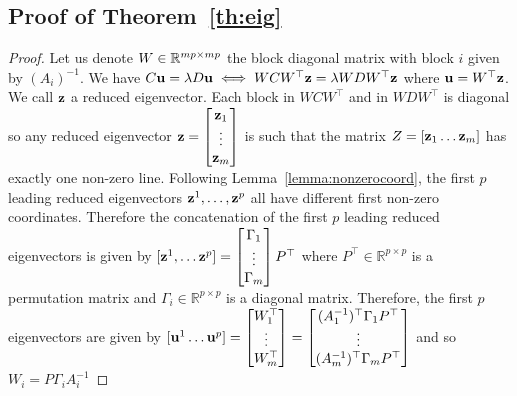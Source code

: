 \documentclass{report}
\begin{document}
\subsection{Proof of Theorem~\ref{th:eig}}
\label{proof:eig}
\begin{proof}
  Let us denote $W \in \mathbb{R}^{mp \times mp}$ the block diagonal matrix with block $i$ given by
  $(A_i)^{-1}$. We have $C \mathbf{u} = \lambda D \mathbf{u}  \iff W C W^\top \mathbf{z} = \lambda W D W^\top \mathbf{z}
  $ where $\mathbf{u} = W^\top \mathbf{z}$. We call $\mathbf{z}$ a reduced eigenvector.
  Each
  block in $W C W^\top$ and in $W D W^\top$ is diagonal so any reduced eigenvector $\mathbf{z} = \begin{bmatrix} \mathbf{z}_1 \\ \vdots \\ \mathbf{z}_m \end{bmatrix}$ is
  such that the matrix $Z = [\mathbf{z}_1 \dots \mathbf{z}_m]$ has exactly one non-zero line.
  Following Lemma~\ref{lemma:nonzerocoord}, the first $p$ leading reduced
  eigenvectors $\mathbf{z}^1, \dots, \mathbf{z}^p$ all have different first non-zero coordinates.
  Therefore the concatenation of the first $p$ leading reduced eigenvectors is given
  by $[\mathbf{z}^1, \dots \mathbf{z}^p] = \begin{bmatrix} \Gamma_1 \\ \vdots \\ \Gamma_m \end{bmatrix} P^{\top}$ where $P^{\top} \in \mathbb{R}^{p \times p}$ is a permutation matrix and $\Gamma_i
  \in \mathbb{R}^{p \times p}$ is a diagonal matrix. Therefore, the first $p$
  eigenvectors are given by $[\mathbf{u}^1 \dots \mathbf{u}^p] = \begin{bmatrix} W_1^{\top} \\ \vdots \\ W_m^{\top} \end{bmatrix} = \begin{bmatrix} (A_1^{-1})^{\top} \Gamma_1 P^{\top} \\ \vdots \\ (A_m^{-1})^{\top} \Gamma_m P^{\top} \end{bmatrix}$  and so $W_i = P \Gamma_i A_i^{-1}$
\end{proof}
\end{document}
